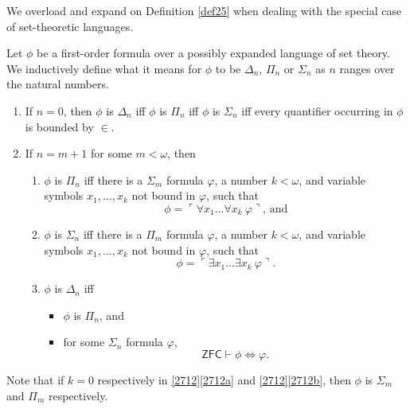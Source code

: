 \documentclass[12pt]{article}
\numberwithin{equation}{section}
\begin{document}
We overload and expand on Definition \ref{def25} when dealing with the special case of set-theoretic languages. 

\begin{defi}\label{def27}
Let $\phi$ be a first-order formula over a possibly expanded language of set theory. We inductively define what it means for $\phi$ to be $\Delta_n$, $\Pi_n$ or $\Sigma_n$ as $n$ ranges over the natural numbers.
\begin{enumerate}[label=(\arabic*)]
    \item\label{def271} If $n = 0$, then $\phi$ is $\Delta_n$ iff $\phi$ is $\Pi_n$ iff $\phi$ is $\Sigma_n$ iff every quantifier occurring in $\phi$ is bounded by $\in$.
    \item\label{2712} If $n = m + 1$ for some $m < \omega$, then 
    \begin{enumerate}[label=(\alph*)]
        \item\label{2712a} $\phi$ is $\Pi_n$ iff there is a $\Sigma_m$ formula $\varphi$, a number $k < \omega$, and variable symbols $x_1, \dots, x_k$ not bound in $\varphi$, such that 
        \begin{equation*}
            \phi = \ulcorner \forall x_1 \dots \forall x_k \ \varphi \urcorner \text{, and}
        \end{equation*}
        \item\label{2712b} $\phi$ is $\Sigma_n$ iff there is a $\Pi_m$ formula $\varphi$, a number $k < \omega$, and variable symbols $x_1, \dots, x_k$ not bound in $\varphi$, such that 
        \begin{equation*}
            \phi = \ulcorner \exists x_1 \dots \exists x_k \ \varphi \urcorner \text{.}
        \end{equation*}
        \item $\phi$ is $\Delta_n$ iff 
        \begin{itemize}[label=$\circ$]
            \item $\phi$ is $\Pi_n$, and
            \item for some $\Sigma_n$ formula $\varphi$,
            \begin{equation*}
                \mathsf{ZFC} \vdash \phi \iff \varphi \text{.}
            \end{equation*}
        \end{itemize}
    \end{enumerate}
\end{enumerate}
Note that if $k = 0$ respectively in \ref{2712}\ref{2712a} and \ref{2712}\ref{2712b}, then $\phi$ is $\Sigma_m$ and $\Pi_m$ respectively.
\end{defi}
\end{document}
